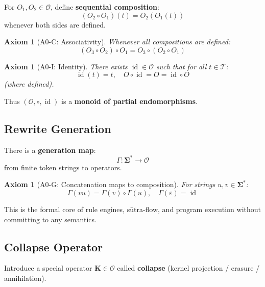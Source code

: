 \documentclass[12pt, oneside]{article}
\newtheorem{axiom}[theorem]{Axiom}
\DeclareMathOperator{\id}{id}
\newcommand{\K}{\mathbf{K}}
\newcommand{\T}{\mathcal{T}}
\newcommand{\Opr}{\mathcal{O}}
\newcommand{\Sg}{\mathbf{\Sigma}}
\begin{document}
For $O_1, O_2 \in \Opr$, define \textbf{sequential composition}:
\begin{equation}
(O_2 \circ O_1)(t) = O_2(O_1(t))
\end{equation}
whenever both sides are defined.

\begin{axiom}[A0-C: Associativity]
Whenever all compositions are defined:
\begin{equation}
(O_3 \circ O_2) \circ O_1 = O_3 \circ (O_2 \circ O_1)
\end{equation}
\end{axiom}

\begin{axiom}[A0-I: Identity]
There exists $\id \in \Opr$ such that for all $t \in \T$:
\begin{equation}
\id(t) = t,\quad O \circ \id = O = \id \circ O
\end{equation}
(where defined).
\end{axiom}

Thus $(\Opr, \circ, \id)$ is a \textbf{monoid of partial endomorphisms}.

\subsection{Rewrite Generation}

There is a \textbf{generation map}:
\begin{equation}
\Gamma: \Sg^* \rightarrow \Opr
\end{equation}
from finite token strings to operators.

\begin{axiom}[A0-G: Concatenation maps to composition]
For strings $u, v \in \Sg^*$:
\begin{equation}
\Gamma(vu) = \Gamma(v) \circ \Gamma(u),\quad \Gamma(\varepsilon) = \id
\end{equation}
\end{axiom}

This is the formal core of rule engines, sūtra-flow, and program execution without committing to any semantics.

\subsection{Collapse Operator}

Introduce a special operator $\K \in \Opr$ called \textbf{collapse} (kernel projection / erasure / annihilation).
\end{document}
